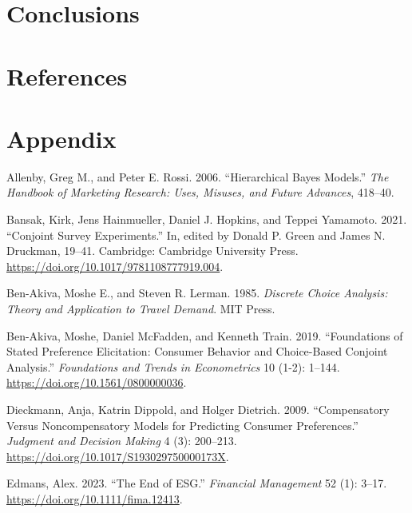 \documentclass[
  12pt,
]{article}
\newlength{\cslhangindent}
\newlength{\cslentryspacingunit} %
\newenvironment{CSLReferences}[2] %
 {%
  \setlength{\parindent}{0pt}
  \ifodd #1
  \let\oldpar\par
  \def\par{\hangindent=\cslhangindent\oldpar}
  \fi
  \setlength{\parskip}{#2\cslentryspacingunit}
 }%
 {}
\begin{document}
\hypertarget{conclusions}{%
\section{Conclusions}\label{conclusions}}

\hypertarget{references}{%
\section{References}\label{references}}

\hypertarget{appendix}{%
\section*{Appendix}\label{appendix}}

\hypertarget{refs}{}
\begin{CSLReferences}{1}{0}
\leavevmode{}%
Allenby, Greg M., and Peter E. Rossi. 2006. {``Hierarchical Bayes Models.''} \emph{The Handbook of Marketing Research: Uses, Misuses, and Future Advances}, 418--40.

\leavevmode{}%
Bansak, Kirk, Jens Hainmueller, Daniel J. Hopkins, and Teppei Yamamoto. 2021. {``Conjoint Survey Experiments.''} In, edited by Donald P. Green and James N. Druckman, 19--41. Cambridge: Cambridge University Press. \url{https://doi.org/10.1017/9781108777919.004}.

\leavevmode{}%
Ben-Akiva, Moshe E., and Steven R. Lerman. 1985. \emph{Discrete Choice Analysis: Theory and Application to Travel Demand}. MIT Press.

\leavevmode{}%
Ben-Akiva, Moshe, Daniel McFadden, and Kenneth Train. 2019. {``Foundations of Stated Preference Elicitation: Consumer Behavior and Choice-Based Conjoint Analysis.''} \emph{Foundations and Trends in Econometrics} 10 (1-2): 1--144. \url{https://doi.org/10.1561/0800000036}.

\leavevmode{}%
Dieckmann, Anja, Katrin Dippold, and Holger Dietrich. 2009. {``Compensatory Versus Noncompensatory Models for Predicting Consumer Preferences.''} \emph{Judgment and Decision Making} 4 (3): 200--213. \url{https://doi.org/10.1017/S193029750000173X}.

\leavevmode{}%
Edmans, Alex. 2023. {``The End of ESG.''} \emph{Financial Management} 52 (1): 3--17. \url{https://doi.org/10.1111/fima.12413}.


\end{CSLReferences}
\end{document}
